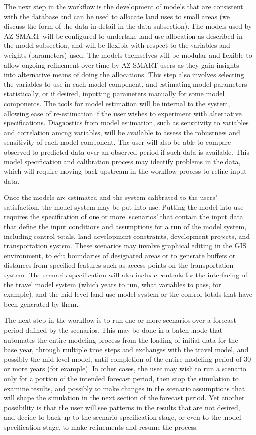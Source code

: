 \documentclass[titlepage]{article}
\begin{document}
The next step in the workflow is the development of models that are consistent with the database and can be used to allocate land uses to small areas (we discuss the form of the data in detail in the data subsection).  The models used by AZ-SMART will be configured to undertake land use allocation as described in the model subsection, and will be flexible with respect to the variables and weights (parameters) used.  The models themselves will be modular and flexible to allow ongoing refinement over time by AZ-SMART users as they gain insights into alternative means of doing the allocations.  This step also involves selecting the variables to use in each model component, and estimating model parameters statistically, or if desired, inputting parameters manually for some model components.  The tools for model estimation will be internal to the system, allowing ease of re-estimation if the user wishes to experiment with alternative specifications.  Diagnostics from model estimation, such as sensitivity to variables and correlation among variables, will be available to assess the robustness and sensitivity of each model component.  The user will also be able to compare observed to predicted data over an observed period if such data is available.  This model specification and calibration process may identify problems in the data, which will require moving back upstream in the workflow process to refine input data.

Once the models are estimated and the system calibrated to the users' satisfaction, the model system may be put into use. Putting the model into use requires the specification of one or more 'scenarios' that contain the input data that define the input conditions and assumptions for a run of the model system, including control totals, land development constraints, development projects, and transportation system.  These scenarios may involve graphical editing in the GIS environment, to edit boundaries of designated areas or to generate buffers or distances from specified features such as access points on the transportation system.  The scenario specification will also include controls for the interfacing of the travel model system (which years to run, what variables to pass, for example), and the mid-level land use model system or the control totals that have been generated by them.

The next step in the workflow is to run one or more scenarios over a forecast period defined by the scenarios.  This may be done in a batch mode that automates the entire modeling process from the loading of initial data for the base year, through multiple time steps and exchanges with the travel model, and possibly the mid-level model, until completion of the entire modeling period of 30 or more years (for example).  In other cases, the user may wish to run a scenario only for a portion of the intended forecast period, then stop the simulation to examine results, and possibly to make changes in the scenario assumptions that will shape the simulation in the next section of the forecast period.  Yet another possibility is that the user will see patterns in the results that are not desired, and decide to back up to the scenario specification stage, or even to the model specification stage, to make refinements and resume the process.
\end{document}
